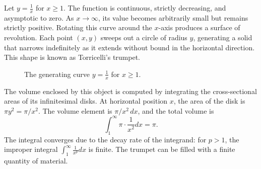 
Let \( y = \frac{1}{x} \) for \( x \geq 1 \). The function is continuous, strictly decreasing, and asymptotic to zero. As \( x \to \infty \), its value becomes arbitrarily small but remains strictly positive. Rotating this curve around the \( x \)-axis produces a surface of revolution. Each point \( (x, y) \) sweeps out a circle of radius \( y \), generating a solid that narrows indefinitely as it extends without bound in the horizontal direction. This shape is known as Torricelli’s trumpet.

\begin{figure}[h!]
\centering
{}
\caption{The generating curve \( y = \frac{1}{x} \) for \( x \ge 1 \).}
\end{figure}

The volume enclosed by this object is computed by integrating the cross-sectional areas of its infinitesimal disks. At horizontal position \( x \), the area of the disk is \( \pi y^2 = \pi/x^2 \). The volume element is \( \pi/x^2 \, dx \), and the total volume is
\[
\int_1^\infty \pi \cdot \frac{1}{x^2} dx = \pi.
\]
The integral converges due to the decay rate of the integrand: for \( p > 1 \), the improper integral \( \int_1^\infty \frac{1}{x^p} dx \) is finite. The trumpet can be filled with a finite quantity of material.


